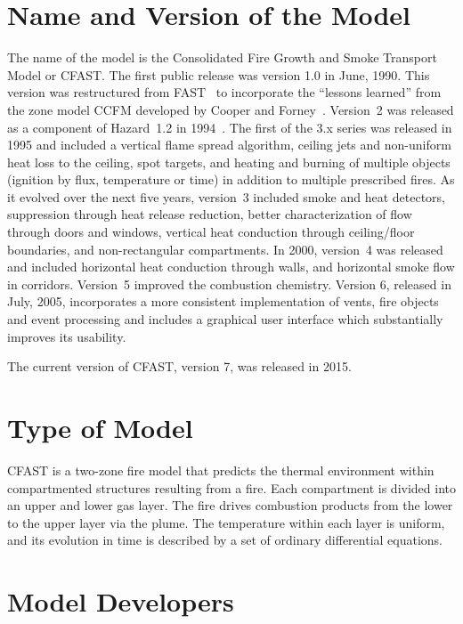 \section{Name and Version of the Model}

The name of the model is the Consolidated Fire Growth and Smoke Transport Model or CFAST. The first public release was version 1.0 in June, 1990. This version was restructured from FAST~\cite{Models:FAST} to incorporate the ``lessons learned'' from the zone model CCFM developed by Cooper and Forney~\cite{Models:CCFM}. Version~2 was released as a component of Hazard~1.2 in 1994~\cite{Models:HAZARDI, Models:HAZARDI_12}. The first of the 3.x series was released in 1995 and included a vertical flame spread algorithm, ceiling jets and non-uniform heat loss to the ceiling, spot targets, and heating and burning of multiple objects (ignition by flux, temperature or time) in addition to multiple prescribed fires. As it evolved over the next five years, version~3 included smoke and heat detectors, suppression through heat release reduction, better characterization of flow through doors and windows, vertical heat conduction through ceiling/floor boundaries, and non-rectangular compartments. In 2000, version~4 was released and included horizontal heat conduction through walls, and horizontal smoke flow in corridors. Version~5 improved the combustion chemistry. Version 6, released in July, 2005, incorporates a more consistent implementation of vents, fire objects and event processing and includes a graphical user interface which substantially improves its usability.

The current version of CFAST, version 7, was released in 2015. 

\section{Type of Model}

CFAST is a two-zone fire model that predicts the thermal environment within compartmented structures resulting from a fire. Each compartment is divided into an upper and lower gas layer. The fire drives combustion products from the lower to the upper layer via the plume. The temperature within each layer is uniform, and its evolution in time is described by a set of ordinary differential equations.

\section{Model Developers}

